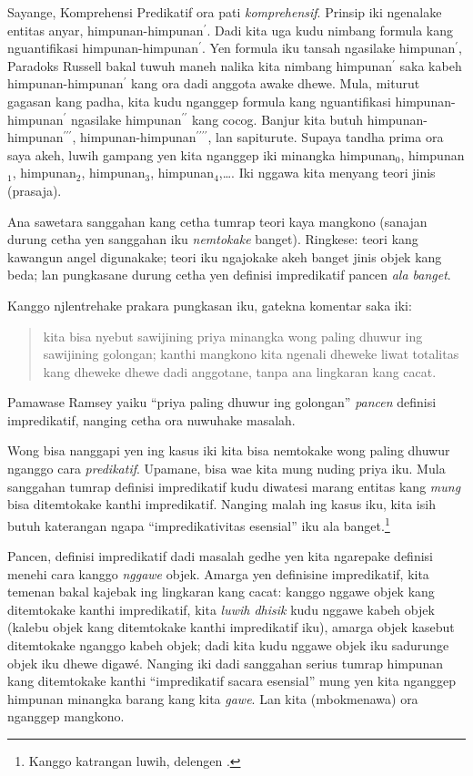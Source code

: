 \documentclass[../../../include/open-logic-section]{subfiles}
\begin{document}
Sayange, Komprehensi Predikatif ora pati \emph{komprehensif}.
Prinsip iki ngenalake entitas anyar, himpunan-himpunan$^\prime$.
Dadi kita uga kudu nimbang formula kang nguantifikasi
himpunan-himpunan$^\prime$. Yen formula iku tansah ngasilake
himpunan$^\prime$, Paradoks Russell bakal tuwuh maneh nalika
kita nimbang himpunan$^\prime$ saka kabeh
himpunan-himpunan$^\prime$ kang ora dadi anggota awake dhewe.
Mula, miturut gagasan kang padha, kita kudu nganggep formula
kang nguantifikasi himpunan-himpunan$^\prime$ ngasilake
himpunan$^{\prime\prime}$ kang cocog. Banjur kita butuh
himpunan-himpunan$^{\prime\prime\prime}$,
himpunan-himpunan$^{\prime\prime\prime\prime}$, lan sapiturute.
Supaya tandha prima ora saya akeh, luwih gampang yen kita
nganggep iki minangka himpunan$_0$, himpunan$_1$, himpunan$_2$,
himpunan$_3$, himpunan$_4$,\ldots. Iki nggawa kita menyang
teori jinis (prasaja).

Ana sawetara sanggahan kang cetha tumrap teori kaya mangkono
(sanajan durung cetha yen sanggahan iku \emph{nemtokake} banget).
Ringkese: teori kang kawangun angel digunakake; teori iku
ngajokake akeh banget jinis objek kang beda; lan pungkasane
durung cetha yen definisi impredikatif pancen \emph{ala banget}.
	
Kanggo njlentrehake prakara pungkasan iku, gatekna komentar saka
\citeauthor{Ramsey1925} iki:
\begin{quote}
	kita bisa nyebut sawijining priya minangka wong paling dhuwur
	ing sawijining golongan; kanthi mangkono kita ngenali dheweke
	liwat totalitas kang dheweke dhewe dadi anggotane, tanpa ana
	lingkaran kang cacat. \citep{Ramsey1925}
\end{quote}
Pamawase Ramsey yaiku ``priya paling dhuwur ing golongan''
\emph{pancen} definisi impredikatif, nanging cetha ora nuwuhake
masalah.

Wong bisa nanggapi yen ing kasus iki kita bisa nemtokake wong
paling dhuwur nganggo cara \emph{predikatif}. Upamane, bisa wae
kita mung nuding priya iku. Mula sanggahan tumrap definisi
impredikatif kudu diwatesi marang entitas kang \emph{mung} bisa
ditemtokake kanthi impredikatif. Nanging malah ing kasus iku,
kita isih butuh katerangan ngapa ``impredikativitas esensial''
iku ala banget.\footnote{Kanggo katrangan luwih, delengen
\citet{Linnebo2010}.}

Pancen, definisi impredikatif dadi masalah gedhe yen kita
ngarepake definisi menehi cara kanggo \emph{nggawe} objek.
Amarga yen definisine impredikatif, kita temenan bakal kajebak
ing lingkaran kang cacat: kanggo nggawe objek kang ditemtokake
kanthi impredikatif, kita \emph{luwih dhisik} kudu nggawe
kabeh objek (kalebu objek kang ditemtokake kanthi impredikatif
iku), amarga objek kasebut ditemtokake nganggo kabeh objek;
dadi kita kudu nggawe objek iku sadurunge objek iku dhewe
digawé. Nanging iki dadi sanggahan serius tumrap himpunan
kang ditemtokake kanthi ``impredikatif sacara esensial'' mung
yen kita nganggep himpunan minangka barang kang kita
\emph{gawe}. Lan kita (mbokmenawa) ora nganggep mangkono.
\end{document}
